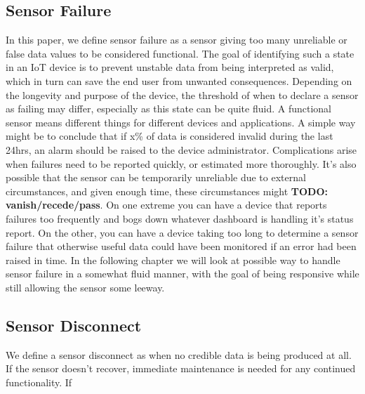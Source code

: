 \subsection{Sensor Failure}

In this paper, we define sensor failure as a sensor giving too many unreliable or false data values to be considered functional. The goal of identifying such a state in an IoT device is to prevent unstable data from being interpreted as valid, which in turn can save the end user from unwanted consequences. Depending on the longevity and purpose of the device, the threshold of when to declare a sensor as failing may differ, especially as this state can be quite fluid. A functional sensor means different things for different devices and applications. A simple way might be to conclude that if x\% of data is considered invalid during the last 24hrs, an alarm should be raised to the device administrator. Complications arise when failures need to be reported quickly, or estimated more thoroughly. It's also possible that the sensor can be temporarily unreliable due to external circumstances, and given enough time, these circumstances might \textbf{TODO: vanish/recede/pass}. On one extreme you can have a device that reports failures too frequently and bogs down whatever dashboard is handling it's status report. On the other, you can have a device taking too long to determine a sensor failure that otherwise useful data could have been monitored if an error had been raised in time. In the following chapter we will look at possible way to handle sensor failure in a somewhat fluid manner, with the goal of being responsive while still allowing the sensor some leeway.




\subsection{Sensor Disconnect}
We define a sensor disconnect as when no credible data is being produced at all. If the sensor doesn't recover, immediate maintenance is needed for any continued functionality. If 